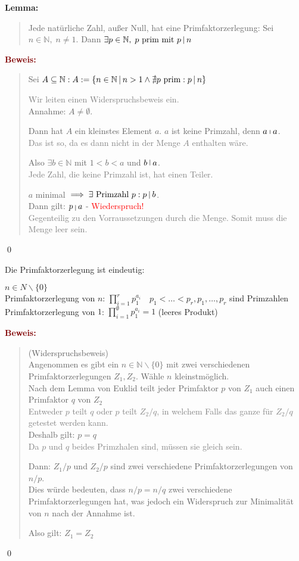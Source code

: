 \documentclass{article}
\newcommand{\smsp}{\phantom{\hspace{3px}}}
\newcommand{\red}[1]{\textcolor{red}{#1}}
\newcommand{\gray}[1]{\textcolor{gray}{#1}}
\newcommand{\dgr}[1]{\textcolor{dgr}{#1}}
\newcommand{\maroon}[1]{\textcolor{maroon}{#1}}
\newcommand{\lem}[1]{\dgr{\textbf{Lemma: }}\begin{quote}#1\end{quote}}
\newcommand{\pr}[1]{\maroon{\textbf{Beweis: }}\begin{quote}#1\end{quote}\qed}
\newcommand{\N}{\mathbb{N}}
\newcommand{\vst}{\smsp \vline \smsp}
\newcommand{\bs}{\backslash}
\begin{document}
\lem{Jede natürliche Zahl, außer Null, hat eine Primfaktorzerlegung: Sei $n \in \N, \; n \neq 1$. Dann $\exists p \in \N, \; p \text{ prim mit } p \vst n$}
\newpage
\pr{
    Sei $A \subseteq \N: A:= \{n \in \N \vst n > 1 \land \nexists p \text{ prim}: p \vst n\}$

    \gray{Wir leiten einen Widerspruchsbeweis ein.}\\
    Annahme: $A \neq \emptyset$.

    Dann hat $A$ ein kleinstes Element $a$. $a$ ist keine Primzahl, denn $a \vst a$.\\
    \gray{Das ist so, da es dann nicht in der Menge $A$ enthalten wäre.}

    Also $\exists b \in \N$ mit $1 < b < a$ und $b \vst a$.\\
    \gray{Jede Zahl, die keine Primzahl ist, hat einen Teiler.}

    $a$ minimal $\implies \exists \text{ Primzahl } p: p \vst b$.\\
    Dann gilt: $p \vst a$ - \red{Wiederspruch!}\\
    \gray{Gegenteilig zu den Vorraussetzungen durch die Menge. Somit muss die Menge leer sein.}
}

Die Primfaktorzerlegung ist eindeutig:

$n \in N \bs \{0\}$\\
Primfaktorzerlegung von $n$: $\prod_{i = 1}^{r}p_1^{a_i} \quad p_1 < \dots < p_r, p_1, \dots, p_r$ sind Primzahlen\\
Primfaktorzerlegung von $1$: $\prod_{i = 1}^{\emptyset}p_1^{a_i} = 1$ (leeres Produkt)

\pr{
    (Widerspruchsbeweis)\\
    Angenommen es gibt ein $n \in \N \bs \{0\}$ mit zwei verschiedenen Primfaktorzerlegungen $Z_1, Z_2$. Wähle $n$ kleinstmöglich.\\
    Nach dem Lemma von Euklid teilt jeder Primfaktor $p$ von $Z_1$ auch einen Primfaktor $q$ von $Z_2$\\
    \gray{Entweder $p$ teilt $q$ oder $p$ teilt $Z_2/q$, in welchem Falls das ganze für $Z_2/q$ getestet werden kann.}\\
    Deshalb gilt: $p=q$\\
    \gray{Da $p$ und $q$ beides Primzhalen sind, müssen sie gleich sein.}

    Dann: $Z_1/p$ und $Z_2/p$ sind zwei verschiedene Primfaktorzerlegungen von $n/p$.\\
    Dies würde bedeuten, dass $n/p = n/q$ zwei verschiedene Primfaktorzerlegungen hat, was jedoch ein Widerspruch zur Minimalität von $n$ nach der Annahme ist.

    Also gilt: $Z_1 = Z_2$
}
\end{document}

